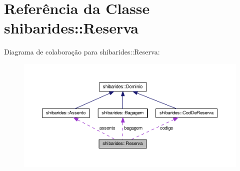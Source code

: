 \hypertarget{classshibarides_1_1Reserva}{}\section{Referência da Classe shibarides\+:\+:Reserva}
\label{classshibarides_1_1Reserva}


Diagrama de colaboração para shibarides\+:\+:Reserva\+:\nopagebreak
\begin{figure}[H]
\begin{center}
\leavevmode
\includegraphics[width=350pt]{classshibarides_1_1Reserva__coll__graph}
\end{center}
\end{figure}
